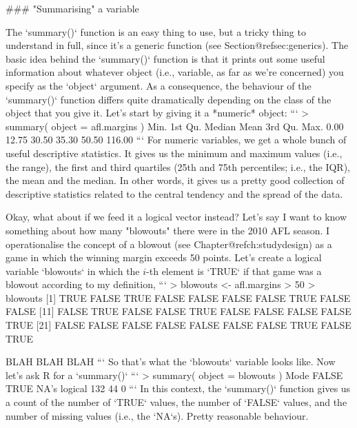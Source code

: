 ### "Summarising" a variable

The `summary()` function is an easy thing to use, but a tricky thing to understand in full, since it's a generic function (see Section@refsec:generics). The basic idea behind the `summary()` function is that it prints out some useful information about whatever object (i.e., variable, as far as we're concerned) you specify as the `object` argument. As a consequence, the behaviour of the `summary()` function differs quite dramatically depending on the class of the object that you give it. Let's start by giving it a *numeric* object:
```
> summary( object = afl.margins )  
   Min. 1st Qu.  Median    Mean 3rd Qu.    Max. 
   0.00   12.75   30.50   35.30   50.50  116.00 
```
For numeric variables, we get a whole bunch of useful descriptive statistics. It gives us the minimum and maximum values (i.e., the range), the first and third quartiles (25th and 75th percentiles; i.e., the IQR), the mean and the median. In other words, it gives us a pretty good collection of descriptive statistics related to the central tendency and the spread of the data.

Okay, what about if we feed it a logical vector instead? Let's say I want to know something about how many "blowouts" there were in the 2010 AFL season. I operationalise the concept of a blowout (see Chapter@refch:studydesign) as a game in which the winning margin exceeds 50 points. Let's create a logical variable `blowouts` in which the $i$-th element is `TRUE` if that game was a blowout according to my definition, 
```
> blowouts <-  afl.margins > 50
> blowouts
  [1]  TRUE FALSE  TRUE FALSE FALSE FALSE FALSE  TRUE FALSE FALSE
 [11] FALSE  TRUE FALSE FALSE  TRUE FALSE FALSE FALSE FALSE  TRUE
 [21] FALSE FALSE FALSE FALSE FALSE FALSE FALSE  TRUE FALSE  TRUE
 
  BLAH BLAH BLAH
```
So that's what the `blowouts` variable looks like. Now let's ask R for a `summary()` 
```
> summary( object = blowouts )
   Mode   FALSE    TRUE    NA's 
logical     132      44       0 
```
In this context, the `summary()` function gives us a count of the number of `TRUE` values, the number of `FALSE` values, and the number of missing values (i.e., the `NA`s). Pretty reasonable behaviour. 

